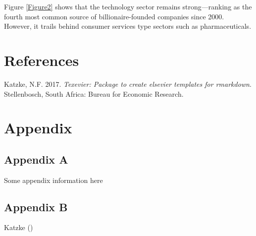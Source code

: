 \documentclass[11pt,preprint]{elsarticle}
\numberwithin{equation}{section}
\numberwithin{figure}{section}
\numberwithin{table}{section}
\newlength{\cslhangindent}
\newenvironment{CSLReferences}[2] %
{\begin{list}{}{%
	\setlength{\itemindent}{0pt}
	\setlength{\leftmargin}{0pt}
	\setlength{\parsep}{0pt}
	\ifodd #1
	\setlength{\leftmargin}{\cslhangindent}
	\setlength{\itemindent}{-1\cslhangindent}
	\fi
	\setlength{\itemsep}{#2\baselineskip}}}
{\end{list}}
\begin{document}
Figure \ref{Figure2} shows that the technology sector remains
strong---ranking as the fourth most common source of billionaire-founded
companies since 2000. However, it trails behind consumer services type
sectors such as pharmaceuticals.

\hfill

\section*{References}\label{references}

\label{refs}
\begin{CSLReferences}{1}{1}
Katzke, N.F. 2017. \emph{{Texevier}: {P}ackage to create elsevier
templates for rmarkdown}. Stellenbosch, South Africa: Bureau for
Economic Research.

\end{CSLReferences}

\section*{Appendix}\label{appendix}

\subsection*{Appendix A}\label{appendix-a}

Some appendix information here

\subsection*{Appendix B}\label{appendix-b}

Katzke ()


\end{document}
